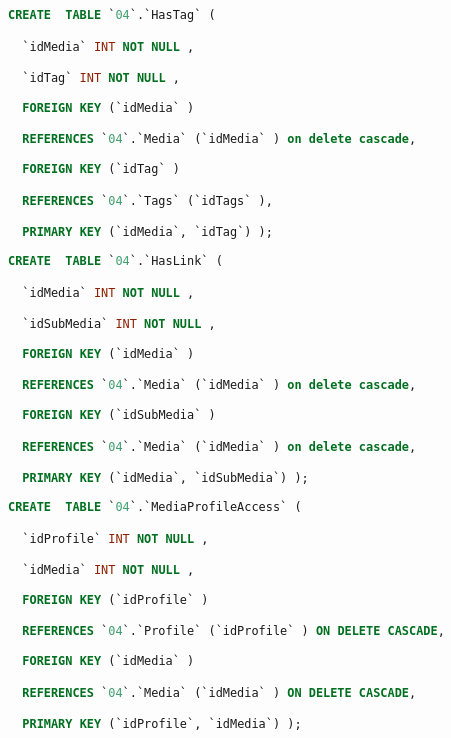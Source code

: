 \begin{lstlisting}[language=SQL,breaklines=true, label=createHasTag, caption=Create HasTag]
CREATE  TABLE `04`.`HasTag` (

  `idMedia` INT NOT NULL ,

  `idTag` INT NOT NULL ,
  
  FOREIGN KEY (`idMedia` )

  REFERENCES `04`.`Media` (`idMedia` ) on delete cascade,
  
  FOREIGN KEY (`idTag` )

  REFERENCES `04`.`Tags` (`idTags` ),

  PRIMARY KEY (`idMedia`, `idTag`) );

\end{lstlisting}

\begin{lstlisting}[language=SQL,breaklines=true, label=createHasLink, caption=Create HasLink]
CREATE  TABLE `04`.`HasLink` (

  `idMedia` INT NOT NULL ,

  `idSubMedia` INT NOT NULL ,
  
  FOREIGN KEY (`idMedia` )

  REFERENCES `04`.`Media` (`idMedia` ) on delete cascade,
  
  FOREIGN KEY (`idSubMedia` )

  REFERENCES `04`.`Media` (`idMedia` ) on delete cascade,

  PRIMARY KEY (`idMedia`, `idSubMedia`) );

\end{lstlisting}

\begin{lstlisting}[language=SQL,breaklines=true, label=createMediaProfileAccess, caption=Create MediaProfileAccess]
CREATE  TABLE `04`.`MediaProfileAccess` (

  `idProfile` INT NOT NULL ,

  `idMedia` INT NOT NULL ,
  
  FOREIGN KEY (`idProfile` )

  REFERENCES `04`.`Profile` (`idProfile` ) ON DELETE CASCADE,
  
  FOREIGN KEY (`idMedia` )

  REFERENCES `04`.`Media` (`idMedia` ) ON DELETE CASCADE,

  PRIMARY KEY (`idProfile`, `idMedia`) );

\end{lstlisting}

